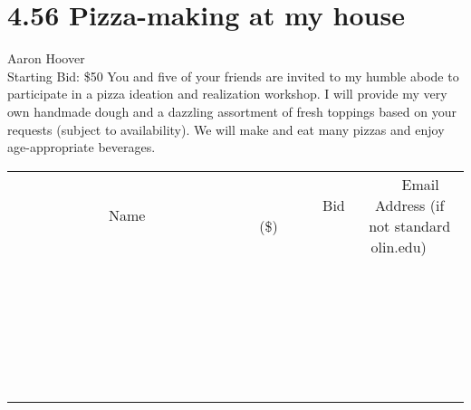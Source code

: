 \documentclass[11pt]{article}
\begin{document}
\section*{4.56 Pizza-making at my house}
Aaron Hoover
\\
Starting Bid: \$50
\newline
You and five of your friends are invited to my humble abode to participate in a pizza ideation and realization workshop. I will provide my very own handmade dough and a dazzling assortment of fresh toppings based on your requests (subject to availability). We will make and eat many pizzas and enjoy age-appropriate beverages.
\\[6ex]
\begin{tabular}{c c c}
~~~~~~~~~~~~~Name~~~~~~~~~~~~~ & ~~~~~~~~~Bid (\$)~~~~~~~~~  & ~~~Email Address (if not standard olin.edu)~~~\\
 & & \\
\hline
 & & \\
\hline
 & & \\
\hline
 & & \\
\hline
 & & \\
\hline
 & & \\
\hline
 & & \\
\hline
 & & \\
\hline
 & & \\
\hline
 & & \\
\hline
 & & \\
\hline
 & & \\
\hline
 & & \\
\hline
 & & \\
\hline
 & & \\
\hline
 & & \\
\hline
 & & \\
\hline
 & & \\
\hline
 & & \\
\hline
 & & \\
\hline
 & & \\
\hline
 & & \\
\hline
 & & \\
\hline
 & & \\
\hline
 & & \\
\hline
 & & \\
\hline
\end{tabular}
\newpage
\end{document}

